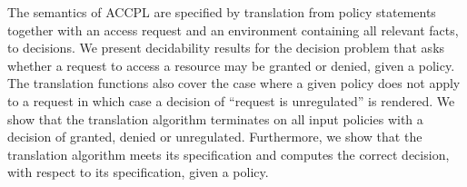 The semantics of \ac{ACCPL} are specified by translation from policy statements together with an access request and an environment containing all relevant facts, to decisions. We present decidability results for the decision problem that asks whether a request to access a resource may be granted or denied, given a policy. The translation functions also cover the case where a given policy does not apply to a request in which case a decision of ``request is unregulated'' is rendered. We show that the translation algorithm terminates on all input policies with a decision of granted, denied or unregulated. Furthermore, we show that the translation algorithm meets its specification and computes the correct decision, with respect to its specification, given a policy. 

\cleardoublepage

